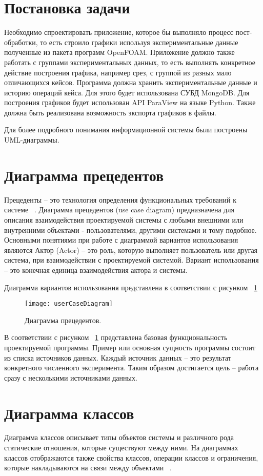 \documentclass[14pt]{extreport}
\begin{document}
\section{Постановка задачи}
Необходимо спроектировать приложение, которое бы выполняло процесс пост-обработки, то есть строило графики используя экспериментальные данные полученные из пакета программ OpenFOAM. Приложение должно также работать с группами экспериментальных данных, то есть выполнять конкретное действие построения графика, например срез, с группой из разных мало отличающихся кейсов. Программа должна хранить экспериментальные данные и историю операций кейса. Для этого будет использована СУБД MongoDB. Для построения графиков будет использован API ParaView на языке Python. Также должна быть реализована возможность экспорта графиков в файлы.

Для более подробного понимания информационной системы были построены UML-диаграммы. 

\section{Диаграмма прецедентов}
Прецеденты -- это технология определения функциональных требований к системе ~\cite{umlDistilled}. 
Диаграмма прецедентов (use case diagram) предназначена для описания взаимодействия проектируемой системы с любыми внешними или внутренними объектами - пользователями, другими системами и тому подобное.
Основными понятиями при работе с диаграммой вариантов использования являются 
Актор (Actor) -- это роль, которую выполняет пользователь или другая система, при взаимодействии с проектируемой системой.
Вариант использования -- это конечная единица взаимодействия актора и системы. 

Диаграмма вариантов использования представлена в соответствии с рисунком ~\ref{fig5}
\begin{figure}[H]
\centerline{\texttt{[image: userCaseDiagram]}}
\caption{Диаграмма прецедентов.}
\label{fig5}
\end{figure}

В соответствии с рисунком ~\ref{fig5} представлена базовая функциональность проектируемой программы. Пример или основная сущность программы состоит из списка источников данных. Каждый источник данных -- это результат конкретного численного эксперимента. Таким образом достигается цель -- работа сразу с несколькими источниками данных.   
\section{Диаграмма классов}
Диаграмма классов описывает типы объектов системы и различного рода статические отношения, которые существуют между ними. На диаграммах классов отображаются также свойства классов, операции классов и ограничения, которые накладываются на связи между объектами ~\cite{umlDistilled}.
\end{document}
